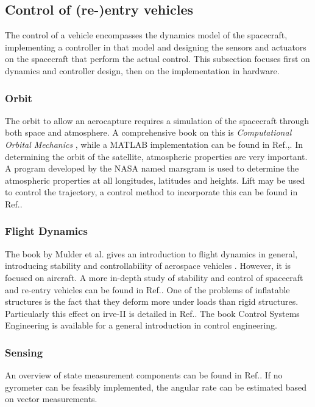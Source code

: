 \subsection{Control of (re-)entry vehicles} \label{sec:control}
The control of a vehicle encompasses the dynamics model of the spacecraft, implementing a controller in that model and designing the sensors and actuators on the spacecraft that perform the actual control. This subsection focuses first on dynamics and controller design, then on the implementation in hardware.

\subsubsection{Orbit}
The orbit to allow an aerocapture requires a simulation of the spacecraft through both space and atmosphere. A comprehensive book on this is \textit{Computational Orbital Mechanics} \cite{Weiland2004}, while a MATLAB implementation can be found in Ref.\cite{Leszczynski1998},. In determining the orbit of the satellite, atmospheric properties are very important. A program developed by the NASA named \gls{marsgram} is used to determine the atmospheric properties at all longitudes, latitudes and heights.\cite{Justus2001} Lift may be used to control the trajectory, a control method to incorporate this can be found in Ref.\cite{Esmaelzadeh2010}.

\subsubsection{Flight Dynamics}
The book by Mulder et al. gives an introduction to flight dynamics in general, introducing stability and controllability of aerospace vehicles \cite{Mulder2013}. However, it is focused on aircraft. A more in-depth study of stability and control of spacecraft and re-entry vehicles can be found in Ref.\cite{Steketee1967, Ito2002}. One of the problems of inflatable structures is the fact that they deform more under loads than rigid structures.\cite{Axdahl2009} Particularly this effect on \gls{irve}-II is detailed in Ref.\cite{Bose2009}. The book Control Systems Engineering is available for a general introduction in control engineering. \cite{Nise2011}

\subsubsection{Sensing}
An overview of state measurement components can be found in Ref.\cite{Wertz2011}. If no gyrometer can be feasibly implemented, the angular rate can be estimated based on vector measurements. \cite{Azor1998}

